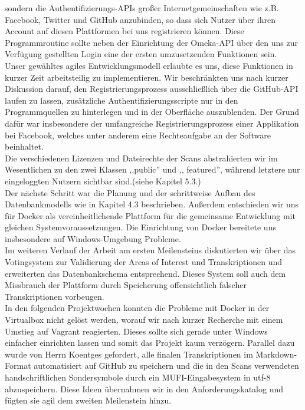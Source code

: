\documentclass{article}
\begin{document}
sondern die Authentifizierungs-APIs großer Internetgemeinschaften wie z.B. Facebook, Twitter und GitHub anzubinden, so dass sich Nutzer über ihren Account auf diesen Plattformen bei uns registrieren können.
Diese Programmroutine sollte neben der Einrichtung der Omeka-API über den uns zur Verfügung gestellten Login eine der ersten umzusetzenden Funktionen sein.\\
Unser gewähltes agiles Entwicklungsmodell erlaubte es uns, diese Funktionen in kurzer Zeit arbeitsteilig zu implementieren.
Wir beschränkten uns nach kurzer Diskussion darauf, den Registrierungsprozess ausschließlich über die GitHub-API laufen zu lassen, zusätzliche Authentifizierungsscripte nur in den Programmquellen zu hinterlegen und in der Oberfläche auszublenden. 
Der Grund dafür war insbesondere der umfangreiche Registrierungsprozess einer Applikation bei Facebook, welches unter anderem eine Rechteaufgabe an der Software beinhaltet.\\
Die verschiedenen Lizenzen und Dateirechte der Scans abstrahierten wir im Wesentlichen zu den zwei Klassen ,,public'' und ,, featured'', während letztere nur eingeloggten Nutzern sichtbar sind.(siehe Kapitel 5.3.)\\
Der nächste Schritt war die Planung und der schrittweise Aufbau des Datenbankmodells wie in Kapitel 4.3 beschrieben. 
Außerdem entschieden wir uns für Docker als vereinheitlichende Plattform für die gemeinsame Entwicklung mit gleichen Systemvoraussetzungen.
Die Einrichtung von Docker bereitete uns insbesondere auf Windows-Umgebung Probleme.\\
Im weiteren Verlauf der Arbeit am ersten Meilensteins diskutierten wir über das Votingsystem zur Validierung der Areas of Interest und Transkriptionen und 
erweiterten das Datenbankschema entsprechend. 
Dieses System soll auch dem Missbrauch der Plattform durch Speicherung offensichtlich falscher Transkriptionen vorbeugen.\\
In den folgenden Projektwochen konnten die Probleme mit Docker in der Virtualbox nicht gelöst werden, worauf wir nach kurzer Recherche mit einem Umstieg auf Vagrant reagierten.
Dieses sollte sich gerade unter Windows einfacher einrichten lassen und somit das Projekt kaum verzögern.
Parallel dazu wurde von Herrn Koentges gefordert, alle finalen Transkriptionen im Markdown-Format automatisiert auf GitHub zu speichern und
die in den Scans verwendeten handschriftlichen Sondersymbole durch ein MUFI-Eingabesystem in utf-8 abzuspeichern.
Diese Ideen übernahmen wir in den Anforderungskatalog und fügten sie agil dem zweiten Meilenstein hinzu.\\
\end{document}
